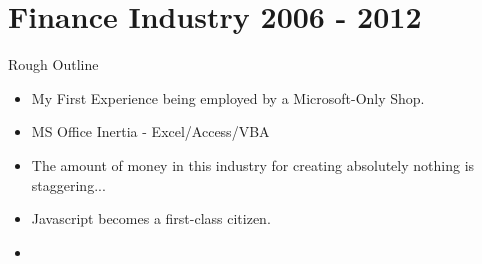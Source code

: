 \section{Finance Industry 2006 - 2012}
Rough Outline
\begin{itemize}
\item My First Experience being employed by a Microsoft-Only Shop.
\item MS Office Inertia - Excel/Access/VBA
\item The amount of money in this industry for creating absolutely
  nothing is staggering...
\item Javascript becomes a first-class citizen.
\item 

\end{itemize}
